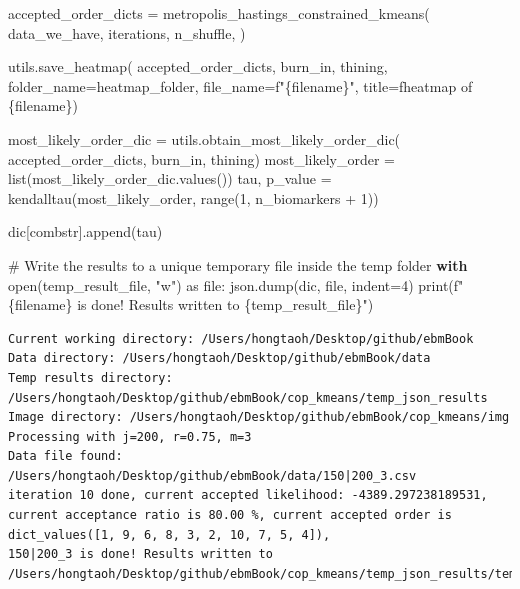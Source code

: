 \documentclass[
  letterpaper,
  DIV=11,
  numbers=noendperiod]{scrreprt}
\newenvironment{Shaded}{\begin{snugshade}}{\end{snugshade}}
\newcommand{\BuiltInTok}[1]{\textcolor[rgb]{0.00,0.23,0.31}{#1}}
\newcommand{\CommentTok}[1]{\textcolor[rgb]{0.37,0.37,0.37}{#1}}
\newcommand{\ControlFlowTok}[1]{\textcolor[rgb]{0.00,0.23,0.31}{\textbf{#1}}}
\newcommand{\DecValTok}[1]{\textcolor[rgb]{0.68,0.00,0.00}{#1}}
\newcommand{\ImportTok}[1]{\textcolor[rgb]{0.00,0.46,0.62}{#1}}
\newcommand{\NormalTok}[1]{\textcolor[rgb]{0.00,0.23,0.31}{#1}}
\newcommand{\OperatorTok}[1]{\textcolor[rgb]{0.37,0.37,0.37}{#1}}
\newcommand{\SpecialCharTok}[1]{\textcolor[rgb]{0.37,0.37,0.37}{#1}}
\newcommand{\SpecialStringTok}[1]{\textcolor[rgb]{0.13,0.47,0.30}{#1}}
\newcommand{\StringTok}[1]{\textcolor[rgb]{0.13,0.47,0.30}{#1}}
\begin{document}
\begin{Shaded}
\begin{Highlighting}[]
\NormalTok{    accepted\_order\_dicts }\OperatorTok{=}\NormalTok{ metropolis\_hastings\_constrained\_kmeans(}
\NormalTok{        data\_we\_have,}
\NormalTok{        iterations,}
\NormalTok{        n\_shuffle,}
\NormalTok{    )}

\NormalTok{    utils.save\_heatmap(}
\NormalTok{        accepted\_order\_dicts,}
\NormalTok{        burn\_in, }
\NormalTok{        thining, }
\NormalTok{        folder\_name}\OperatorTok{=}\NormalTok{heatmap\_folder,}
\NormalTok{        file\_name}\OperatorTok{=}\SpecialStringTok{f"}\SpecialCharTok{\{}\NormalTok{filename}\SpecialCharTok{\}}\SpecialStringTok{"}\NormalTok{, }
\NormalTok{        title}\OperatorTok{=}\SpecialStringTok{f\textquotesingle{}heatmap of }\SpecialCharTok{\{}\NormalTok{filename}\SpecialCharTok{\}}\SpecialStringTok{\textquotesingle{}}\NormalTok{)}
    
\NormalTok{    most\_likely\_order\_dic }\OperatorTok{=}\NormalTok{ utils.obtain\_most\_likely\_order\_dic(}
\NormalTok{        accepted\_order\_dicts, burn\_in, thining)}
\NormalTok{    most\_likely\_order }\OperatorTok{=} \BuiltInTok{list}\NormalTok{(most\_likely\_order\_dic.values())}
\NormalTok{    tau, p\_value }\OperatorTok{=}\NormalTok{ kendalltau(most\_likely\_order, }\BuiltInTok{range}\NormalTok{(}\DecValTok{1}\NormalTok{, n\_biomarkers }\OperatorTok{+} \DecValTok{1}\NormalTok{))}
    
\NormalTok{    dic[combstr].append(tau)}
    
    \CommentTok{\# Write the results to a unique temporary file inside the temp folder}
    \ControlFlowTok{with} \BuiltInTok{open}\NormalTok{(temp\_result\_file, }\StringTok{"w"}\NormalTok{) }\ImportTok{as} \BuiltInTok{file}\NormalTok{:}
\NormalTok{        json.dump(dic, }\BuiltInTok{file}\NormalTok{, indent}\OperatorTok{=}\DecValTok{4}\NormalTok{)}
    \BuiltInTok{print}\NormalTok{(}\SpecialStringTok{f"}\SpecialCharTok{\{}\NormalTok{filename}\SpecialCharTok{\}}\SpecialStringTok{ is done! Results written to }\SpecialCharTok{\{}\NormalTok{temp\_result\_file}\SpecialCharTok{\}}\SpecialStringTok{"}\NormalTok{)}
\end{Highlighting}
\end{Shaded}

\begin{verbatim}
Current working directory: /Users/hongtaoh/Desktop/github/ebmBook
Data directory: /Users/hongtaoh/Desktop/github/ebmBook/data
Temp results directory: /Users/hongtaoh/Desktop/github/ebmBook/cop_kmeans/temp_json_results
Image directory: /Users/hongtaoh/Desktop/github/ebmBook/cop_kmeans/img
Processing with j=200, r=0.75, m=3
Data file found: /Users/hongtaoh/Desktop/github/ebmBook/data/150|200_3.csv
iteration 10 done, current accepted likelihood: -4389.297238189531, current acceptance ratio is 80.00 %, current accepted order is dict_values([1, 9, 6, 8, 3, 2, 10, 7, 5, 4]), 
150|200_3 is done! Results written to /Users/hongtaoh/Desktop/github/ebmBook/cop_kmeans/temp_json_results/temp_results_200_0.75_3.json
\end{verbatim}
\end{document}
